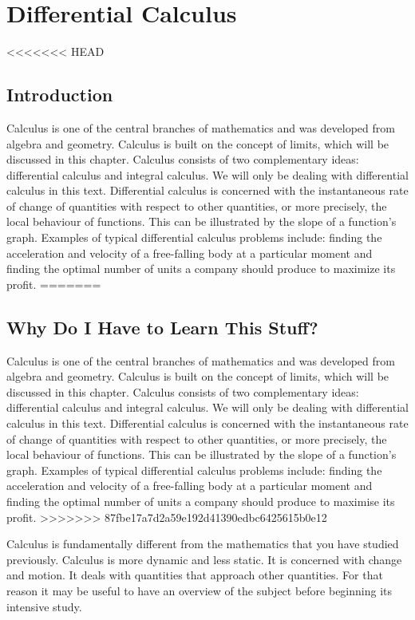 \chapter{Differential Calculus}
\label{m:fg:diff12}

<<<<<<< HEAD
\section{Introduction}
Calculus is one of the central branches of mathematics and was developed from algebra and geometry. Calculus is built on the concept of limits, which will be discussed in this chapter. Calculus consists of two complementary ideas: differential calculus and integral calculus. We will only be dealing with differential calculus in this text. Differential calculus is concerned with the instantaneous rate of change of quantities with respect to other quantities, or more precisely, the local behaviour of functions. This can be illustrated by the slope of a function's graph. Examples of typical differential calculus problems include: finding the acceleration and velocity of a free-falling body at a particular moment and finding the optimal number of units a company should produce to maximize its profit.
=======
\section{Why Do I Have to Learn This Stuff?}
Calculus is one of the central branches of mathematics and was developed from algebra and geometry. Calculus is built on the concept of limits, which will be discussed in this chapter. Calculus consists of two complementary ideas: differential calculus and integral calculus. We will only be dealing with differential calculus in this text. Differential calculus is concerned with the instantaneous rate of change of quantities with respect to other quantities, or more precisely, the local behaviour of functions. This can be illustrated by the slope of a function's graph. Examples of typical differential calculus problems include: finding the acceleration and velocity of a free-falling body at a particular moment and finding the optimal number of units a company should produce to maximise its profit.
>>>>>>> 87fbe17a7d2a59e192d41390edbc6425615b0e12

Calculus is fundamentally different from the mathematics that you have studied previously. Calculus is more dynamic and less static. It is concerned with change and motion. It deals with quantities that approach other quantities. For that reason it may be useful to have an overview of the subject before beginning its intensive study. 

